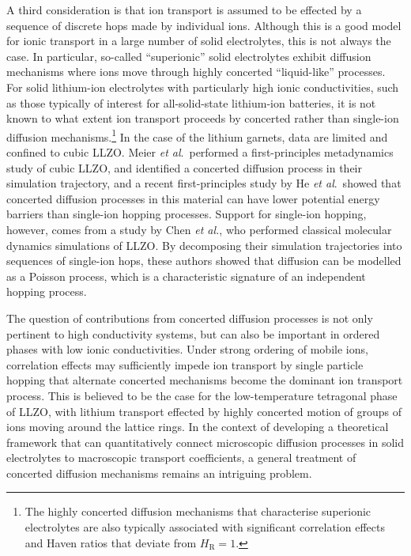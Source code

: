 \documentclass[aps,prb,twocolumn,superscriptaddress,reprint]{revtex4-1}
\begin{document}
A third consideration is that ion transport is assumed to be effected by a sequence of discrete hops made by individual ions. Although this is a good model for ionic transport in a large number of solid electrolytes, this is not always the case. In particular, so-called ``superionic'' solid electrolytes exhibit diffusion mechanisms where ions move through highly concerted ``liquid-like'' processes.\cite{Catlow_AnnRevMaterSci1986,Hull_RepProgPhys2004} For solid lithium-ion electrolytes with particularly high ionic conductivities, such as those typically of interest for  all-solid-state lithium-ion batteries, it is not known to what extent ion transport proceeds by concerted rather than single-ion diffusion mechanisms.\footnote{The highly concerted diffusion mechanisms that characterise superionic electrolytes are also typically associated with significant correlation effects and Haven ratios that deviate from $H_\mathrm{R}=1$.\cite{SalanneEtAl_JPhysChemC2012,Hull_RepProgPhys2004}} In the case of the lithium garnets, data are limited and confined to cubic LLZO. Meier \emph{et al}.\ performed a first-principles metadynamics study of cubic LLZO, and identified a concerted diffusion process in their simulation trajectory,\cite{MeierEtAl_JPhysChemC2014} and a recent first-principles study by He \emph{et al}.\ showed that concerted diffusion processes in this material can have lower potential energy barriers than single-ion hopping processes.\cite{HeEtAl_NatureComm2017} Support for single-ion hopping, however, comes from a study by Chen \emph{et al.}, who performed classical molecular dynamics simulations of LLZO.\cite{ChenEtAl_SciRep2017} By decomposing their simulation trajectories into sequences of single-ion hops, these authors showed that diffusion can be modelled as a Poisson process, which is a characteristic signature of an independent hopping process.\cite{MorganAndMadden_PhysRevLett2014}

The question of contributions from concerted diffusion processes is not only pertinent to high conductivity systems, but can also be important in ordered phases with low ionic conductivities. Under strong ordering of mobile ions, correlation effects may sufficiently impede ion transport by single particle hopping that alternate concerted mechanisms become the dominant ion transport process.\cite{MorganAndMadden_PhysRevLett2014} This is believed to be the case for the low-temperature tetragonal phase of LLZO, with lithium transport effected by highly concerted motion of groups of ions moving around the lattice rings. \cite{BurbanoEtAl_PhysRevLett2016} In the context of developing a theoretical framework that can quantitatively connect microscopic diffusion processes in solid electrolytes to macroscopic transport coefficients, a general treatment of concerted diffusion mechanisms remains an intriguing problem. 
\end{document}

